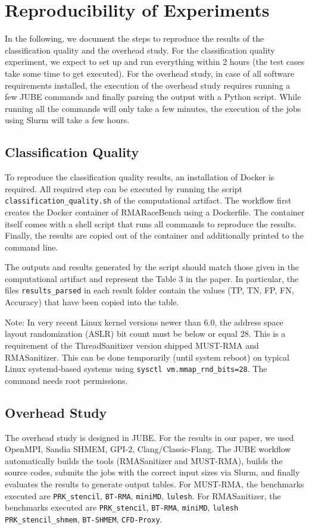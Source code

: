 \documentclass[twoside]{article}
\begin{document}
\section*{Reproducibility of Experiments}
In the following, we document the steps to reproduce the results of the classification quality and the overhead study.
For the classification quality experiment, we expect to set up and run everything within 2 hours (the test cases take some time to get executed).
For the overhead study, in case of all software requirements installed, the execution of the overhead study requires running a few JUBE commands and finally parsing the output with a Python script. While running all the commands will only take a few minutes, the execution of the jobs using Slurm will take a few hours.

\subsection*{Classification Quality}
To reproduce the classification quality results, an installation of Docker is required.
All required step can be executed by running the script \texttt{classification\_quality.sh} of the computational artifact.
The workflow first creates the Docker container of RMARaceBench using a Dockerfile.
The container itself comes with a shell script that runs all commands to reproduce the results.
Finally, the results are copied out of the container and additionally printed to the command line.

The outputs and results generated by the script should match those given in the computational artifact and represent the Table 3 in the paper.
In particular, the files \texttt{results\_parsed} in each result folder contain the values (TP, TN, FP, FN, Accuracy) that have been copied into the table.

Note: In very recent Linux kernel versions newer than 6.0, the address space layout randomization (ASLR) bit count must be below or equal 28. This is a requirement of the ThreadSanitizer version shipped MUST-RMA and RMASanitizer. This can be done temporarily (until system reboot) on typical Linux systemd-based systems using \texttt{sysctl vm.mmap\_rnd\_bits=28}. The command needs root permissions. 


\subsection*{Overhead Study}
The overhead study is designed in JUBE.
For the results in our paper, we used OpenMPI, Sandia SHMEM, GPI-2, Clang/Classic-Flang.
The JUBE workflow automatically builds the tools (RMASanitizer and MUST-RMA), builds the source codes, submits the jobs with the correct input sizes via Slurm, and finally evaluates the results to generate output tables.
For MUST-RMA, the benchmarks executed are \texttt{PRK\_stencil}, \texttt{BT-RMA}, \texttt{miniMD}, \texttt{lulesh}.
For RMASanitizer, the benchmarks executed are \texttt{PRK\_stencil}, \texttt{BT-RMA},  \texttt{miniMD}, \texttt{lulesh} \texttt{PRK\_stencil\_shmem}, \texttt{BT-SHMEM}, \texttt{CFD-Proxy}.
\end{document}
